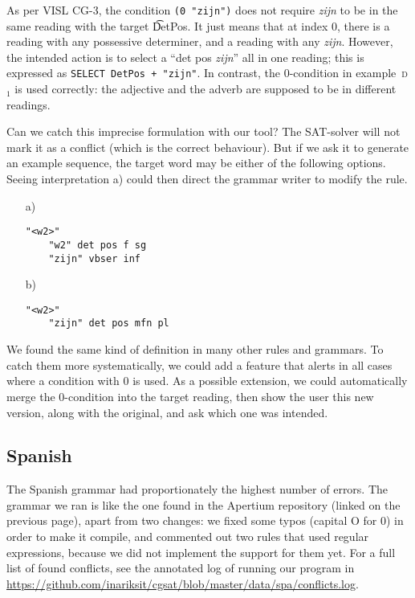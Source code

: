 {{\noindent As per VISL CG-3, the condition \texttt{(0 "zijn")} does not require
 \emph{zijn} to be in the same reading with the target \t{DetPos}.
It just means that at index 0,
there is a reading with any possessive determiner, and a reading with any \emph{zijn}.
However, the intended action is to select a ``det pos \emph{zijn}'' all in one reading;
this is expressed as \texttt{SELECT DetPos + "zijn"}.
In contrast, the 0-condition in example~\textsc{d$_1$} is used correctly:
the adjective and the adverb are supposed to be in different readings.


Can we catch this imprecise formulation with our tool? The SAT-solver will not mark it as a conflict (which is the correct behaviour). But if we ask it to generate an example sequence, the target word may be either of the following options. Seeing interpretation a) could then direct the grammar writer to modify the rule.

\begin{itemize}
\item[a)] \begin{verbatim}
"<w2>"
    "w2" det pos f sg
    "zijn" vbser inf
\end{verbatim}

\item[b)] \begin{verbatim}
"<w2>"
    "zijn" det pos mfn pl
\end{verbatim}
\end{itemize}


We found the same kind of definition in many other rules and grammars.
To catch them more systematically, we could add a feature that alerts in all cases where a condition with 0 is used. As a possible extension, we could automatically merge the 0-condition into the target reading, then show the user this new version, along with the original, and ask which one was intended.


\subsection{Spanish} The Spanish grammar had proportionately the
highest number of errors. The grammar we ran is like the one
found in the Apertium repository (linked on the previous page), 
apart from two changes: we fixed some typos (capital O for 0) in order to make it compile, and
commented out two rules that used regular expressions, because we did not implement the support for them yet.
For a full list of found conflicts, see the annotated log of running our program in \url{
https://github.com/inariksit/cgsat/blob/master/data/spa/conflicts.log}. 


}}
